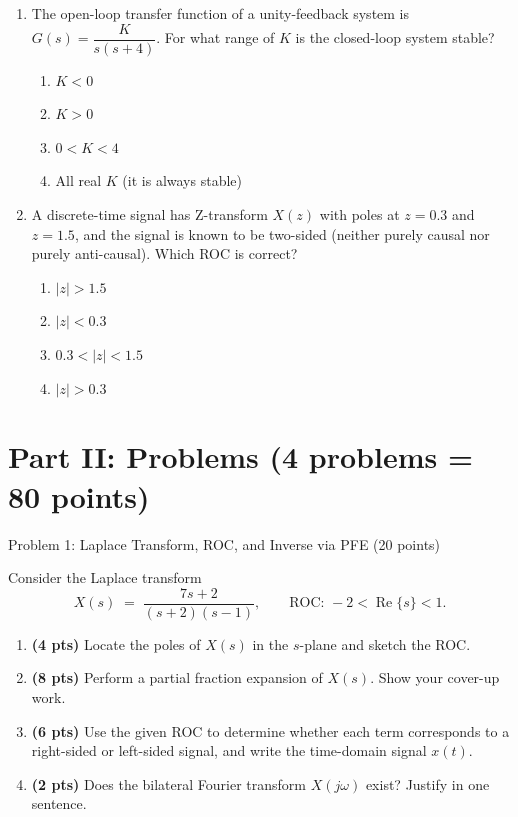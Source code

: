 \documentclass[11pt]{article}
\begin{document}
\begin{enumerate}[leftmargin=*, label=\textbf{\arabic*.}]
\item The open-loop transfer function of a unity-feedback system is $G(s) = \dfrac{K}{s(s+4)}$. For what range of $K$ is the closed-loop system stable?
\begin{enumerate}[label=(\alph*)]
    \item $K < 0$
    \item $K > 0$
    \item $0 < K < 4$
    \item All real $K$ (it is always stable)
\end{enumerate}

\item A discrete-time signal has Z-transform $X(z)$ with poles at $z=0.3$ and $z=1.5$, and the signal is known to be two-sided (neither purely causal nor purely anti-causal). Which ROC is correct?
\begin{enumerate}[label=(\alph*)]
    \item $|z| > 1.5$
    \item $|z| < 0.3$
    \item $0.3 < |z| < 1.5$
    \item $|z| > 0.3$
\end{enumerate}

\end{enumerate}

\newpage

\section*{Part II: Problems \hfill (4 problems = 80 points)}

\begin{problembox}{Problem 1: Laplace Transform, ROC, and Inverse via PFE \hfill (20 points)}
\end{problembox}

\vspace{4pt}
Consider the Laplace transform
\[
X(s) \;=\; \frac{7s+2}{(s+2)(s-1)}, \qquad \text{ROC: } -2 < \operatorname{Re}\{s\} < 1.
\]
\begin{enumerate}[label=(\alph*)]
    \item \textbf{(4 pts)} Locate the poles of $X(s)$ in the $s$-plane and sketch the ROC.
    \item \textbf{(8 pts)} Perform a partial fraction expansion of $X(s)$. Show your cover-up work.
    \item \textbf{(6 pts)} Use the given ROC to determine whether each term corresponds to a right-sided or left-sided signal, and write the time-domain signal $x(t)$.
    \item \textbf{(2 pts)} Does the bilateral Fourier transform $X(j\omega)$ exist? Justify in one sentence.
\end{enumerate}
\end{document}
